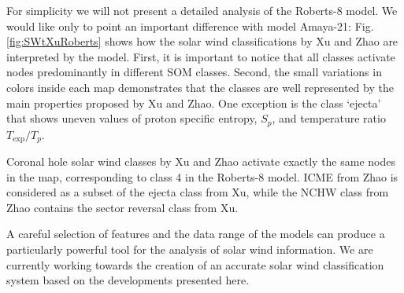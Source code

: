 For simplicity we will not present a detailed analysis of the Roberts-8 model. We would like only to point an important difference with model Amaya-21: Fig.\ref{fig:SWtXuRoberts} shows how the solar wind classifications by Xu and Zhao are interpreted by the model. First, it is important to notice that all classes activate nodes predominantly in different SOM classes. Second, the small variations in colors inside each map demonstrates that the classes are well represented by the main properties proposed by Xu and Zhao. One exception is the class `ejecta' that shows uneven values of proton specific entropy, $S_p$, and temperature ratio $T_{\text{exp}}/T_p$.

Coronal hole solar wind classes by Xu and Zhao activate exactly the same nodes in the map, corresponding to class 4 in the Roberts-8 model. ICME from Zhao is considered as a subset of the ejecta class from Xu, while the NCHW class from Zhao contains the sector reversal class from Xu.

A careful selection of features and the data range of the models can produce a particularly powerful tool for the analysis of solar wind information. We are currently working towards the creation of an accurate solar wind classification system based on the developments presented here.